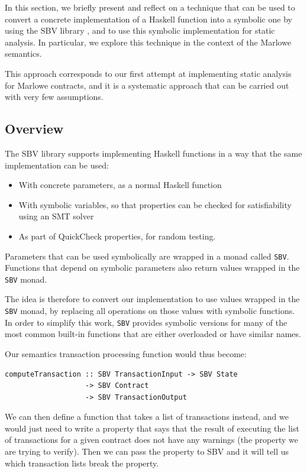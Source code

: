 \documentclass[english,runningheads]{llncs}
\begin{document}
In this section, we briefly present and reflect on a technique that
can be used to convert a concrete implementation of a Haskell function
into a symbolic one by using the SBV library \cite{erkok2019sbv}, and to use this symbolic
implementation for static analysis. In particular, we explore this
technique in the context of the Marlowe semantics.

This approach corresponds to our first attempt at implementing static
analysis for Marlowe contracts, and it is a systematic approach that
can be carried out with very few assumptions. 

\subsection{Overview}

The SBV library supports implementing Haskell functions in a way that
the same implementation can be used:
\begin{itemize}
\item With concrete parameters, as a normal Haskell function
\item With symbolic variables, so that properties can be checked for satisfiability
using an SMT solver
\item As part of QuickCheck properties, for random testing.
\end{itemize}
Parameters that can be used symbolically are wrapped in a monad called
\texttt{SBV}. Functions that depend on symbolic parameters also return
values wrapped in the \texttt{SBV} monad.

The idea is therefore to convert our implementation to use values
wrapped in the \texttt{SBV} monad, by replacing all operations on
those values with symbolic functions. In order to simplify this work,
\texttt{SBV} provides symbolic versions for many of the most common
built-in functions that are either overloaded or have similar names.

Our semantics transaction processing function would thus become:

\begin{verbatim}
computeTransaction :: SBV TransactionInput -> SBV State
                   -> SBV Contract
                   -> SBV TransactionOutput
\end{verbatim}

We can then define a function that takes a list of transactions instead,
and we would just need to write a property that says that the result
of executing the list of transactions for a given contract does not
have any warnings (the property we are trying to verify). Then we
can pass the property to SBV and it will tell us which transaction
lists break the property.
\end{document}

